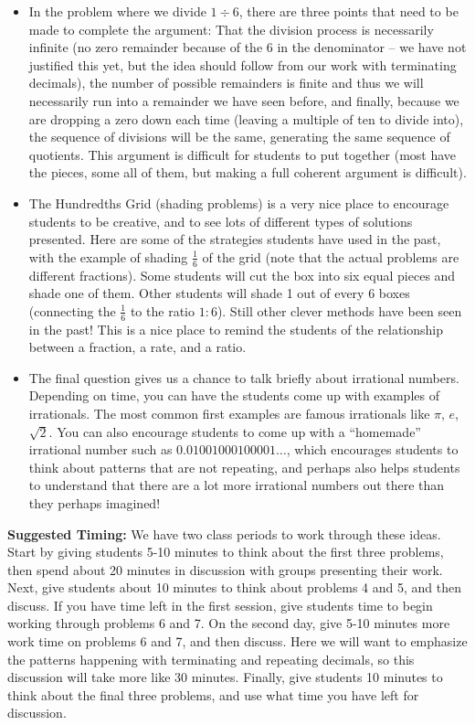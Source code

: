 \documentclass[noauthor, nooutcomes]{ximera}
\begin{document}
\begin{instructorNotes}
\begin{itemize}
  \item In the problem where we divide $1 \div 6$, there are three points that need to be made to complete the argument:  That the division process is necessarily infinite (no zero remainder because of the 6 in the denominator -- we have not justified this yet, but the idea should follow from our work with terminating decimals), the number of possible remainders is finite and thus we will necessarily run into a remainder we have seen before, and finally, because we are dropping a zero down each time (leaving a multiple of ten to divide into), the sequence of divisions will be the same, generating the same sequence of quotients. This argument is difficult for students to put together (most have the  pieces, some all of them, but making a full coherent argument is difficult).
  
  \item The Hundredths Grid (shading problems) is a very nice place to encourage students to be creative, and to see lots of different types of solutions presented. Here are some of the strategies students have used in the past, with the example of shading $\frac16$ of the grid (note that the actual problems are different fractions). Some students will cut the box into six equal pieces and shade one of them. Other students will shade 1 out of every 6 boxes (connecting the $\frac{1}{6}$ to the ratio $1:6$). Still other clever methods have been seen in the past! This is a nice place to remind the students of the relationship between a fraction, a rate, and a ratio.


\item The final question gives us a chance to talk briefly about irrational numbers. Depending on time, you can have the students come up with examples of irrationals. The most common first examples are famous irrationals like $\pi$, $e$, $\sqrt{2}$. You can also encourage students to come up with a ``homemade'' irrational number such as $0.01001000100001\dots$, which encourages students to think about patterns that are not repeating, and perhaps also helps students to understand that there are a lot more irrational numbers out there than they perhaps imagined! 


 \end{itemize}


{\bf Suggested Timing:} We have two class periods to work through these ideas. Start by giving students 5-10 minutes to think about the first three problems, then spend about 20 minutes in discussion with groups presenting their work. Next, give students about 10 minutes to think about problems 4 and 5, and then discuss. If you have time left in the first session, give students time to begin working through problems 6 and 7. On the second day, give 5-10 minutes more work time on problems 6 and 7, and then discuss. Here we will want to emphasize the patterns happening with terminating and repeating decimals, so this discussion will take more like 30 minutes. Finally, give students 10 minutes to think about the final three problems, and use what time you have left for discussion.
\end{instructorNotes}
\end{document}
